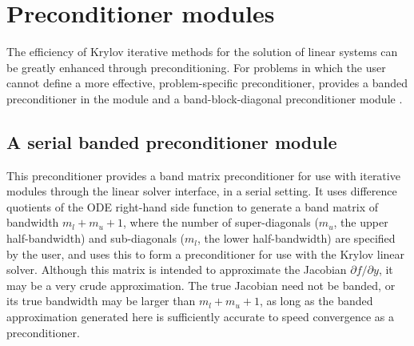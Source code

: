 \section{Preconditioner modules}\label{ss:preconds}

The efficiency of Krylov iterative methods for the solution of linear systems
can be greatly enhanced through preconditioning. For problems in which the
user cannot define a more effective, problem-specific preconditioner,
{\cvodes} provides a banded preconditioner in the module {\cvbandpre} and
a band-block-diagonal preconditioner module {\cvbbdpre}.

\subsection{A serial banded preconditioner module}\label{sss:cvbandpre}


This preconditioner provides a band matrix preconditioner for use with
iterative {\sunlinsol} modules through the {\cvls} linear solver
interface, in a serial setting.
It uses difference quotients of the ODE right-hand side function  to
generate a band matrix of bandwidth $m_l + m_u + 1$, where the number of
super-diagonals ($m_u$, the upper half-bandwidth) and sub-diagonals
($m_l$, the lower half-bandwidth) are specified by the user, and uses this to
form a preconditioner for use with the Krylov linear solver.
Although this matrix is intended to approximate the Jacobian
$\partial f / \partial y$, it may be a very crude approximation.  The true Jacobian
need not be banded, or its true bandwidth may be larger than $m_l + m_u + 1$, as
long as the banded approximation generated here is sufficiently accurate to
speed convergence as a preconditioner.

